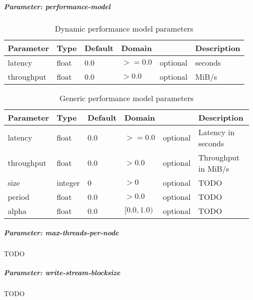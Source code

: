 \subparagraph{Parameter: performance-model}


\begin{preserve}
\begin{table}[!ht]
  \begin{center}
    \begin{tabularx}{\textwidth}{lllllX}
      Parameter  & Type  & Default & Domain &          & Description \\ 
      \hline
      latency    & float & 0.0     & $>=0.0$  & optional & seconds     \\ 
      throughput & float & 0.0     & $>0.0$   & optional & MiB/s       \\ 
    \end{tabularx}
  \end{center}
  \caption{Dynamic performance model parameters}%
  \label{tab:dyn_perf_model_conf_params}
\end{table}
\end{preserve}


\begin{preserve}
\begin{table}[!ht]
  \begin{center}
    \begin{tabularx}{\textwidth}{lllllX}
      Parameter  & Type    & Default & Domain      &          & Description         \\ 
      \hline
      latency    & float   & 0.0     & $>=0.0$     & optional & Latency in seconds  \\ 
      throughput & float   & 0.0     & $>0.0$      & optional & Throughput in MiB/s \\ 
      size       & integer & 0       & $>0$        & optional & TODO                \\ 
      period     & float   & 0.0     & $>0.0$      & optional & TODO                \\ 
      alpha      & float   & 0.0     & $[0.0,1.0)$ & optional & TODO                \\ 
    \end{tabularx}
  \end{center}
  \caption{Generic performance model parameters}%
  \label{tab:gen_perf_model_conf_params}
\end{table}
\end{preserve}



\subparagraph{Parameter: max-threads-per-node}
TODO

\subparagraph{Parameter: write-stream-blocksize}
TODO

